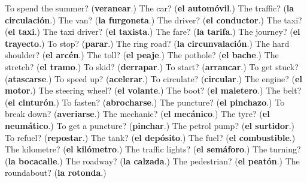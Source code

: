 \begin{tcolorbox}[breakable,colback=teal!4,colframe=teal!35!black,title={Before you move on}]
To spend the summer? (\textbf{veranear}.) The car? (\textbf{el automóvil}.) The traffic? (\textbf{la circulación}.) The van? (\textbf{la furgoneta}.) The driver? (\textbf{el conductor}.) The taxi? (\textbf{el taxi}.) The taxi driver? (\textbf{el taxista}.) The fare? (\textbf{la tarifa}.) The journey? (\textbf{el trayecto}.) To stop? (\textbf{parar}.) The ring road? (\textbf{la circunvalación}.) The hard shoulder? (\textbf{el arcén}.) The toll? (\textbf{el peaje}.) The pothole? (\textbf{el bache}.) The stretch? (\textbf{el tramo}.) To skid? (\textbf{derrapar}.) To start? (\textbf{arrancar}.) To get stuck? (\textbf{atascarse}.) To speed up? (\textbf{acelerar}.) To circulate? (\textbf{circular}.) The engine? (\textbf{el motor}.) The steering wheel? (\textbf{el volante}.) The boot? (\textbf{el maletero}.) The belt? (\textbf{el cinturón}.) To fasten? (\textbf{abrocharse}.) The puncture? (\textbf{el pinchazo}.) To break down? (\textbf{averiarse}.) The mechanic? (\textbf{el mecánico}.) The tyre? (\textbf{el neumático}.) To get a puncture? (\textbf{pinchar}.) The petrol pump? (\textbf{el surtidor}.) To refuel? (\textbf{repostar}.) The tank? (\textbf{el depósito}.) The fuel? (\textbf{el combustible}.) The kilometre? (\textbf{el kilómetro}.) The traffic lights? (\textbf{el semáforo}.) The turning? (\textbf{la bocacalle}.) The roadway? (\textbf{la calzada}.) The pedestrian? (\textbf{el peatón}.) The roundabout? (\textbf{la rotonda}.)
\end{tcolorbox}
